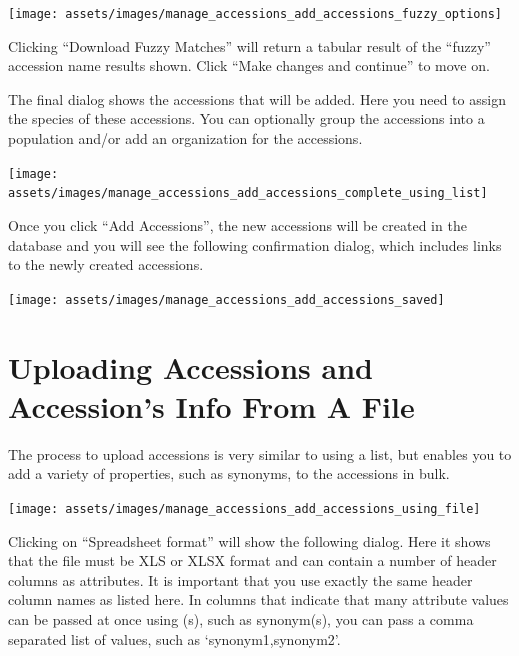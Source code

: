 \documentclass[
  12pt,
]{book}
\begin{document}
\begin{center}\texttt{[image: assets/images/manage\_accessions\_add\_accessions\_fuzzy\_options]} \end{center}

Clicking ``Download Fuzzy Matches'' will return a tabular result of the ``fuzzy'' accession name results shown. Click ``Make changes and continue'' to move on.

The final dialog shows the accessions that will be added. Here you need to assign the species of these accessions. You can optionally group the accessions into a population and/or add an organization for the accessions.

\begin{center}\texttt{[image: assets/images/manage\_accessions\_add\_accessions\_complete\_using\_list]} \end{center}

Once you click ``Add Accessions'', the new accessions will be created in the database and you will see the following confirmation dialog, which includes links to the newly created accessions.

\begin{center}\texttt{[image: assets/images/manage\_accessions\_add\_accessions\_saved]} \end{center}

\hypertarget{uploading-accessions-and-accessions-info-from-a-file}{%
\section{Uploading Accessions and Accession's Info From A File}\label{uploading-accessions-and-accessions-info-from-a-file}}

The process to upload accessions is very similar to using a list, but enables you to add a variety of properties, such as synonyms, to the accessions in bulk.

\begin{center}\texttt{[image: assets/images/manage\_accessions\_add\_accessions\_using\_file]} \end{center}

Clicking on ``Spreadsheet format'' will show the following dialog. Here it shows that the file must be XLS or XLSX format and can contain a number of header columns as attributes. It is important that you use exactly the same header column names as listed here. In columns that indicate that many attribute values can be passed at once using (s), such as synonym(s), you can pass a comma separated list of values, such as `synonym1,synonym2'.
\end{document}
